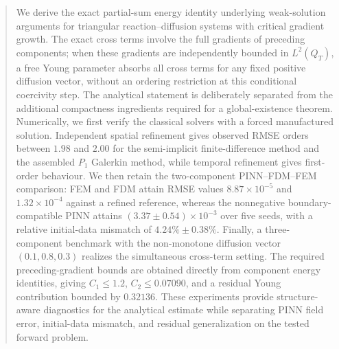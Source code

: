 \documentclass{birkjour}
\theoremstyle{definition}
\theoremstyle{remark}
\numberwithin{equation}{section}
\begin{document}
\begin{abstract}
We derive the exact partial-sum energy identity underlying weak-solution arguments for triangular reaction--diffusion systems with critical gradient growth. The exact cross terms involve the full gradients of preceding components; when these gradients are independently bounded in $L^2(Q_T)$, a free Young parameter absorbs all cross terms for any fixed positive diffusion vector, without an ordering restriction at this conditional coercivity step. The analytical statement is deliberately separated from the additional compactness ingredients required for a global-existence theorem. Numerically, we first verify the classical solvers with a forced manufactured solution. Independent spatial refinement gives observed RMSE orders between $1.98$ and $2.00$ for the semi-implicit finite-difference method and the assembled $P_1$ Galerkin method, while temporal refinement gives first-order behaviour. We then retain the two-component PINN--FDM--FEM comparison: FEM and FDM attain RMSE values $8.87\times10^{-5}$ and $1.32\times10^{-4}$ against a refined reference, whereas the nonnegative boundary-compatible PINN attains $(3.37\pm0.54)\times10^{-3}$ over five seeds, with a relative initial-data mismatch of $4.24\%\pm0.38\%$. Finally, a three-component benchmark with the non-monotone diffusion vector $(0.1,0.8,0.3)$ realizes the simultaneous cross-term setting. The required preceding-gradient bounds are obtained directly from component energy identities, giving $C_1\le1.2$, $C_2\le0.07090$, and a residual Young contribution bounded by $0.32136$. These experiments provide structure-aware diagnostics for the analytical estimate while separating PINN field error, initial-data mismatch, and residual generalization on the tested forward problem.
\end{abstract}

\maketitle






\end{document}
